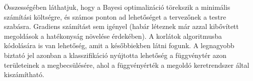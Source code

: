 Összességében láthatjuk, hogy a Bayesi optimalizáció törekszik a minimális számítási költségre, és számos ponton ad lehetőséget a tervezőnek a testre szabásra. Gradiens számítást sem igényel (habár léteznek már azzal kibővített megoldások a hatékonyság növelése érdekében). 
A korlátok algoritmusba kódolására is van lehetőség, amit a későbbiekben látni fogunk. 
A legnagyobb biztató jel azonban a klasszifikáció nyújtotta lehetőség a függvénytér azon területeinek a megbecsülésére, ahol a függvényérték a megoldó keretrendszer által kiszámítható.

